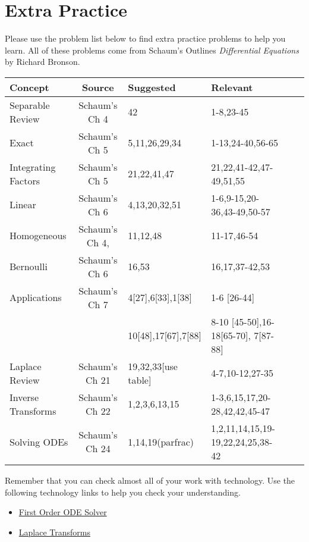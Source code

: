 
\section*{Extra Practice}

Please use the problem list below to find extra practice problems to help you learn.  All of these problems come from Schaum's Outlines \textit{Differential Equations} by Richard Bronson. 

\begin{center}
\begin{tabular}{|l|c|l|l|l|l|}
\hline
Concept	&Source	&Suggested	&Relevant	\\\hline
Separable Review&Schaum's Ch 4 & 42 &1-8,23-45	\\\hline
Exact &Schaum's Ch 5 & 5,11,26,29,34& 1-13,24-40,56-65	\\\hline
Integrating Factors&Schaum's Ch 5 & 21,22,41,47 & 21,22,41-42,47-49,51,55	\\\hline
Linear&Schaum's Ch 6 &4,13,20,32,51 & 1-6,9-15,20-36,43-49,50-57	\\\hline
Homogeneous&Schaum's Ch 4, &11,12,48 &11-17,46-54	\\\hline
Bernoulli &Schaum's Ch 6 & 16,53& 16,17,37-42,53	\\\hline
Applications&Schaum's Ch 7 &4[27],6[33],1[38] & 1-6 [26-44]	\\
            &              &10[48],17[67],7[88] & 8-10 [45-50],16-18[65-70], 7[87-88]	\\\hline
Laplace Review &Schaum's Ch 21 & 19,32,33[use table] & 4-7,10-12,27-35	\\\hline
Inverse Transforms &Schaum's Ch 22 & 1,2,3,6,13,15 & 1-3,6,15,17,20-28,42,42,45-47	\\\hline
Solving ODEs &Schaum's Ch 24 & 1,14,19(parfrac) & 1,2,11,14,15,19-19,22,24,25,38-42 	\\\hline
\end{tabular}
\end{center}

Remember that you can check almost all of your work with technology.  Use the following technology links to help you check your understanding.
\begin{itemize}
 \item \href{\urlfirstorderodesolver}{First Order ODE Solver}
 \item \href{\urllaplacetransforms}{Laplace Transforms}
\end{itemize}








\restoregeometry

